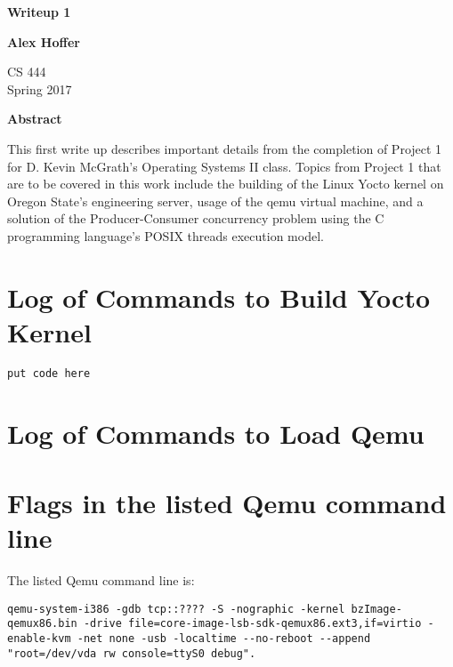 \documentclass[letterpaper,10pt,titlepage]{article}
\begin{document}
\begin{titlepage}
    \begin{center}
        \vspace*{3.5cm}

        \textbf{Writeup 1}

        \vspace{0.5cm}

        \textbf{Alex Hoffer}

        \vspace{0.8cm}

        CS 444\\
        Spring 2017\\

        \vspace{1cm}

        \textbf{Abstract}\\

        \vspace{0.5cm}

        This first write up describes important details from the completion of Project 1 for D. Kevin McGrath's Operating Systems II class. Topics from Project 1 that are to be covered in this work include the building of the Linux Yocto kernel on Oregon State's engineering server, usage of the qemu virtual machine, and a solution of the Producer-Consumer concurrency problem using the C programming language's POSIX threads execution model. 

        \vfill

    \end{center}
\end{titlepage}

\newpage

\tableofcontents

\newpage

\section{Log of Commands to Build Yocto Kernel}
\begin{lstlisting}
put code here
\end{lstlisting}

\section{Log of Commands to Load Qemu}

\section{Flags in the listed Qemu command line}
The listed Qemu command line is:
\begin{lstlisting}
qemu-system-i386 -gdb tcp::???? -S -nographic -kernel bzImage-qemux86.bin -drive file=core-image-lsb-sdk-qemux86.ext3,if=virtio -enable-kvm -net none -usb -localtime --no-reboot --append "root=/dev/vda rw console=ttyS0 debug".
\end{lstlisting}
\end{document}
